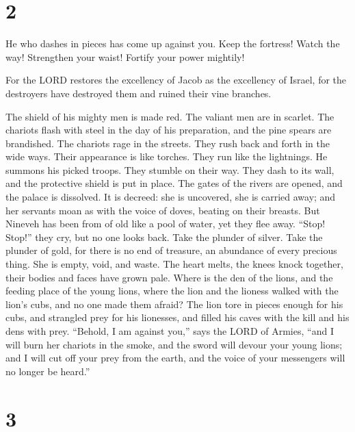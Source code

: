 \hypertarget{section-1}{%
\section{2}\label{section-1}}

 He who dashes in pieces has come up against you. Keep the
fortress! Watch the way! Strengthen your waist! Fortify your power
mightily!

 For the LORD restores the excellency of Jacob as the
excellency of Israel, for the destroyers have destroyed them and ruined
their vine branches.

 The shield of his mighty men is made red. The valiant men
are in scarlet. The chariots flash with steel in the day of his
preparation, and the pine spears are brandished.  The
chariots rage in the streets. They rush back and forth in the wide ways.
Their appearance is like torches. They run like the lightnings.
 He summons his picked troops. They stumble on their way.
They dash to its wall, and the protective shield is put in place.
 The gates of the rivers are opened, and the palace is
dissolved.  It is decreed: she is uncovered, she is carried
away; and her servants moan as with the voice of doves, beating on their
breasts.  But Nineveh has been from of old like a pool of
water, yet they flee away. ``Stop! Stop!'' they cry, but no one looks
back.  Take the plunder of silver. Take the plunder of gold,
for there is no end of treasure, an abundance of every precious thing.
 She is empty, void, and waste. The heart melts, the knees
knock together, their bodies and faces have grown pale. 
Where is the den of the lions, and the feeding place of the young lions,
where the lion and the lioness walked with the lion's cubs, and no one
made them afraid?  The lion tore in pieces enough for his
cubs, and strangled prey for his lionesses, and filled his caves with
the kill and his dens with prey.  ``Behold, I am against
you,'' says the LORD of Armies, ``and I will burn her chariots in the
smoke, and the sword will devour your young lions; and I will cut off
your prey from the earth, and the voice of your messengers will no
longer be heard.''

\hypertarget{section-2}{%
\section{3}\label{section-2}}

